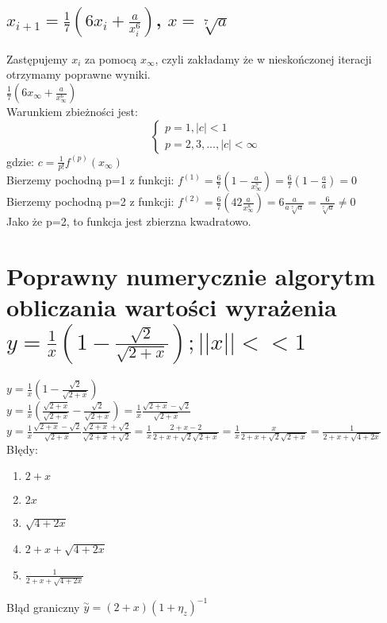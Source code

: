 \documentclass{article}
\begin{document}
\subsection{$x_{i+1}=\frac{1}{7}(6x_i+\frac{a}{x_i^6})$, $x=\sqrt[7]{a}$}
Zastępujemy $x_i$ za pomocą $x_\infty$, czyli zakładamy że w nieskończonej iteracji otrzymamy poprawne wyniki.\\
$\frac{1}{7}(6x_\infty+\frac{a}{x_\infty^6})$\\
Warunkiem zbieżności jest:
\begin{equation*}\begin{cases}
    p=1, |c|<1\\
    p=2,3,..., |c|<\infty
\end{cases}\end{equation*}
gdzie: $c=\frac{1}{p!}f^{(p)}(x_\infty)$\\
Bierzemy pochodną p=1 z funkcji: $f^{(1)}=\frac{6}{7}(1-\frac{a}{x_\infty^7})=\frac{6}{7}(1-\frac{a}{a})=0$\\
Bierzemy pochodną p=2 z funkcji: $f^{(2)}=\frac{6}{7}(42\frac{a}{x_\infty^8})=6\frac{a}{a\sqrt[7]{a}} = \frac{6}{\sqrt[7]{a}}\neq 0$\\
Jako że p=2, to funkcja jest zbierzna kwadratowo.

\section{Poprawny numerycznie algorytm obliczania wartości wyrażenia $y=\frac{1}{x}(1-\frac{\sqrt{2}}{\sqrt{2+x}});||x||<<1$}
$y=\frac{1}{x}(1-\frac{\sqrt{2}}{\sqrt{2+x}})$\\
$y=\frac{1}{x}(\frac{\sqrt{2+x}}{\sqrt{2+x}}-\frac{\sqrt{2}}{\sqrt{2+x}})=\frac{1}{x}\frac{\sqrt{2+x}-\sqrt{2}}{\sqrt{2+x}}$\\
$y=\frac{1}{x}\frac{\sqrt{2+x}-\sqrt{2}}{\sqrt{2+x}}\frac{\sqrt{2+x}+\sqrt{2}}{\sqrt{2+x}+\sqrt{2}}=\frac{1}{x}\frac{2+x-2}{2+x+\sqrt{2}\sqrt{2+x}}=\frac{1}{x}\frac{x}{2+x+\sqrt{2}\sqrt{2+x}}=\frac{1}{2+x+\sqrt{4+2x}}$\\
Błędy:
\begin{enumerate}
    \item $2+x$
    \item $2x$
    \item $\sqrt{4+2x}$
    \item $2+x+\sqrt{4+2x}$
    \item $\frac{1}{2+x+\sqrt{4+2x}}$
\end{enumerate}
Błąd graniczny $\overset{\sim}{y}=(2+x)(1+\eta_z)^{-1}$
\end{document}
